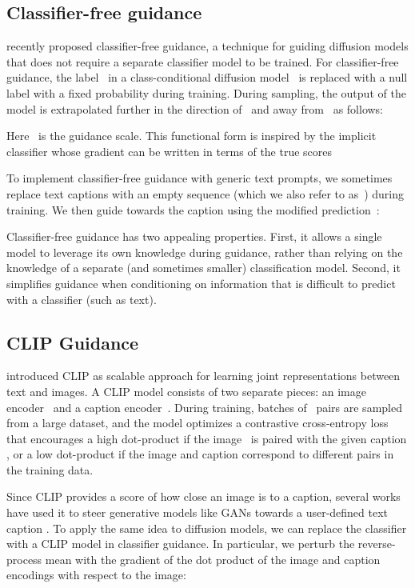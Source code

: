 \documentclass{article}
\begin{document}
\subsection{Classifier-free guidance}
\label{sec:uncondguidance}
\citet{uncond} recently proposed classifier-free guidance, a technique for guiding diffusion models that does not require a separate classifier model to be trained. For classifier-free guidance, the label~ in a class-conditional diffusion model~ is replaced with a null label  with a fixed probability during training. During sampling, the output of the model is extrapolated further in the direction of~ and away from~ as follows:

Here~ is the guidance scale. This functional form is inspired by the implicit classifier  whose gradient can be written in terms of the true scores~ 

To implement classifier-free guidance with generic text prompts, we sometimes replace text captions with an empty sequence (which we also refer to as~) during training. We then guide towards the caption  using the modified prediction~:

Classifier-free guidance has two appealing properties. First, it allows a single model to leverage its own knowledge during guidance, rather than relying on the knowledge of a separate (and sometimes smaller) classification model. Second, it simplifies guidance when conditioning on information that is difficult to predict with a classifier (such as text).

\subsection{CLIP Guidance}
\label{sec:clip}

\citet{clip} introduced CLIP as scalable approach for learning joint representations between text and images. A CLIP model consists of two separate pieces: an image encoder~ and a caption encoder~. During training, batches of~ pairs are sampled from a large dataset, and the model optimizes a contrastive cross-entropy loss that encourages a high dot-product  if the image~ is paired with the given caption , or a low dot-product if the image and caption correspond to different pairs in the training data.





Since CLIP provides a score of how close an image is to a caption, several works have used it to steer generative models like GANs towards a user-defined text caption \cite{clipglass,styleclip,bigsleep,stylegannada}. To apply the same idea to diffusion models, we can replace the classifier with a CLIP model in classifier guidance. In particular, we perturb the reverse-process mean with the gradient of the dot product of the image and caption encodings with respect to the image:
\end{document}
